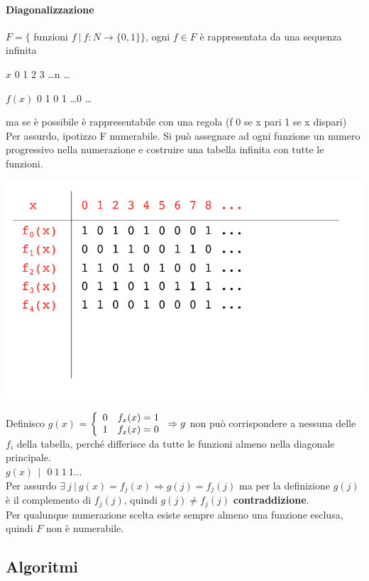 \documentclass[10pt]{book}
\begin{document}
\paragraph{Diagonalizzazione}
$F = \{$ funzioni $f\:|\: f: N \rightarrow \{0, 1\}\}$, ogni $f\in F$ è rappresentata da una sequenza infinita
\begin{list}{}{}
	\item $x$ 0 1 2 3 \ldots n \ldots
	\item $f(x)$ 0 1 0 1 \ldots 0 \ldots
\end{list}
ma se è possibile è rappresentabile con una regola (f 0 se x pari 1 se x dispari)\\
Per assurdo, ipotizzo F numerabile. Si può assegnare ad ogni funzione un numero progressivo nella numerazione e costruire una tabella infinita con tutte le funzioni.
\begin{center}
	\includegraphics[scale=0.6]{3.png}
\end{center}
Definisco $g(x)$ = $\left\{ \begin{array}{l l}
0 & f_x(x) = 1\\ 1 & f_x(x) = 0
\end{array} \right. \Rightarrow g$ non può corrispondere a nessuna delle $f_i$ della tabella, perché differisce da tutte le funzioni almeno nella diagonale principale.\\
$g(x)\:\:|\:\:\:0\:1\:1\:1\ldots$\\
Per assurdo $\exists\:j\:|\:g(x) = f_j(x) \Rightarrow g(j) = f_j(j)$ ma per la definizione $g(j)$ è il complemento di $f_j(j)$, quindi $g(j) \neq f_j(j)$ \textbf{contraddizione}.\\
Per qualunque numerazione scelta esiste sempre almeno una funzione esclusa, quindi $F$ non è numerabile.
\subsection{Algoritmi}
\end{document}
